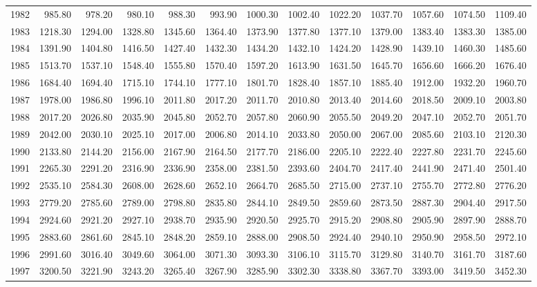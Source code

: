 \begin{longtable}{rrrrrrrrrrrrr}
  1982 & 985.80 & 978.20 & 980.10 & 988.30 & 993.90 & 1000.30 & 1002.40 & 1022.20 & 1037.70 & 1057.60 & 1074.50 & 1109.40 \\ 
  1983 & 1218.30 & 1294.00 & 1328.80 & 1345.60 & 1364.40 & 1373.90 & 1377.80 & 1377.10 & 1379.00 & 1383.40 & 1383.30 & 1385.00 \\ 
  1984 & 1391.90 & 1404.80 & 1416.50 & 1427.40 & 1432.30 & 1434.20 & 1432.10 & 1424.20 & 1428.90 & 1439.10 & 1460.30 & 1485.60 \\ 
  1985 & 1513.70 & 1537.10 & 1548.40 & 1555.80 & 1570.40 & 1597.20 & 1613.90 & 1631.50 & 1645.70 & 1656.60 & 1666.20 & 1676.40 \\ 
  1986 & 1684.40 & 1694.40 & 1715.10 & 1744.10 & 1777.10 & 1801.70 & 1828.40 & 1857.10 & 1885.40 & 1912.00 & 1932.20 & 1960.70 \\ 
  1987 & 1978.00 & 1986.80 & 1996.10 & 2011.80 & 2017.20 & 2011.70 & 2010.80 & 2013.40 & 2014.60 & 2018.50 & 2009.10 & 2003.80 \\ 
  1988 & 2017.20 & 2026.80 & 2035.90 & 2045.80 & 2052.70 & 2057.80 & 2060.90 & 2055.50 & 2049.20 & 2047.10 & 2052.70 & 2051.70 \\ 
  1989 & 2042.00 & 2030.10 & 2025.10 & 2017.00 & 2006.80 & 2014.10 & 2033.80 & 2050.00 & 2067.00 & 2085.60 & 2103.10 & 2120.30 \\ 
  1990 & 2133.80 & 2144.20 & 2156.00 & 2167.90 & 2164.50 & 2177.70 & 2186.00 & 2205.10 & 2222.40 & 2227.80 & 2231.70 & 2245.60 \\ 
  1991 & 2265.30 & 2291.20 & 2316.90 & 2336.90 & 2358.00 & 2381.50 & 2393.60 & 2404.70 & 2417.40 & 2441.90 & 2471.40 & 2501.40 \\ 
  1992 & 2535.10 & 2584.30 & 2608.00 & 2628.60 & 2652.10 & 2664.70 & 2685.50 & 2715.00 & 2737.10 & 2755.70 & 2772.80 & 2776.20 \\ 
  1993 & 2779.20 & 2785.60 & 2789.00 & 2798.80 & 2835.80 & 2844.10 & 2849.50 & 2859.60 & 2873.50 & 2887.30 & 2904.40 & 2917.50 \\ 
  1994 & 2924.60 & 2921.20 & 2927.10 & 2938.70 & 2935.90 & 2920.50 & 2925.70 & 2915.20 & 2908.80 & 2905.90 & 2897.90 & 2888.70 \\ 
  1995 & 2883.60 & 2861.60 & 2845.10 & 2848.20 & 2859.10 & 2888.00 & 2908.50 & 2924.40 & 2940.10 & 2950.90 & 2958.50 & 2972.10 \\ 
  1996 & 2991.60 & 3016.40 & 3049.60 & 3064.00 & 3071.30 & 3093.30 & 3106.10 & 3115.70 & 3129.80 & 3140.70 & 3161.70 & 3187.60 \\ 
  1997 & 3200.50 & 3221.90 & 3243.20 & 3265.40 & 3267.90 & 3285.90 & 3302.30 & 3338.80 & 3367.70 & 3393.00 & 3419.50 & 3452.30 \\ 

\end{longtable}
